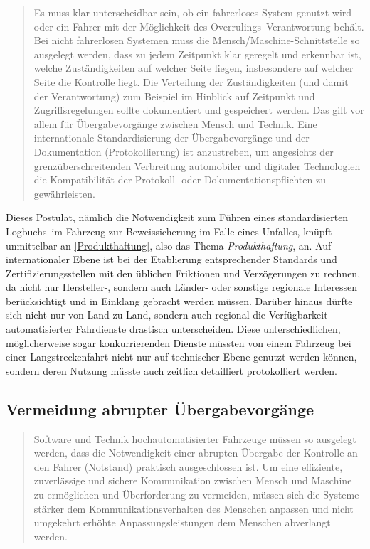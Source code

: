 \documentclass[twoside,a4paper,12pt]{article}
\begin{document}
\begin{quote}
\glqq
Es muss klar unterscheidbar sein, ob ein fahrerloses System genutzt wird oder ein Fahrer
mit der Möglichkeit des \glqq Overrulings\grqq\ Verantwortung behält. Bei nicht fahrerlosen Systemen muss die Mensch/Maschine-Schnittstelle 
so ausgelegt werden, dass zu jedem Zeitpunkt klar geregelt und erkennbar ist, welche Zuständigkeiten auf welcher Seite liegen,
insbesondere auf welcher Seite die Kontrolle liegt. Die Verteilung der Zuständigkeiten
(und damit der Verantwortung) zum Beispiel im Hinblick auf Zeitpunkt und Zugriffsregelungen sollte dokumentiert und gespeichert werden. 
Das gilt vor allem für Übergabevorgänge zwischen Mensch und Technik. Eine internationale Standardisierung der Übergabevorgänge 
und der Dokumentation (Protokollierung) ist anzustreben, um angesichts der
grenzüberschreitenden Verbreitung automobiler und digitaler Technologien die Kompatibilität der Protokoll- oder 
Dokumentationspflichten zu gewährleisten.\grqq\mbox{~\cite[S. 13]{ek}}
\end{quote}

Dieses Postulat, nämlich die Notwendigkeit zum Führen eines standardisierten \glqq Logbuchs\grqq\ im Fahrzeug zur Beweissicherung im Falle eines Unfalles, 
knüpft unmittelbar an \ref{Produkthaftung}, also das Thema \textit{Produkthaftung}, an. Auf internationaler Ebene ist bei der Etablierung entsprechender 
Standards und Zertifizierungsstellen mit den üblichen Friktionen und Verzögerungen zu rechnen, da nicht nur Hersteller-, sondern auch Länder- oder 
sonstige regionale Interessen berücksichtigt und in Einklang gebracht werden müssen. Darüber hinaus dürfte sich nicht nur von Land zu Land, sondern auch
regional die Verfügbarkeit automatisierter Fahrdienste drastisch unterscheiden. Diese unterschiedlichen, möglicherweise sogar konkurrierenden Dienste müssten von einem Fahrzeug bei einer Langstreckenfahrt nicht nur auf technischer Ebene genutzt werden können, sondern deren Nutzung müsste auch zeitlich detailliert protokolliert werden.\\

\subsection{Vermeidung abrupter Übergabevorgänge} \label{VermeidungAbrupterUebergabevorgaenge}

\begin{quote}
\glqq
Software und Technik hochautomatisierter Fahrzeuge müssen so ausgelegt werden, dass
die Notwendigkeit einer abrupten Übergabe der Kontrolle an den Fahrer (\glqq Notstand\grqq)
praktisch ausgeschlossen ist. Um eine effiziente, zuverlässige und sichere Kommunikation zwischen Mensch und Maschine zu 
ermöglichen und Überforderung zu vermeiden,
müssen sich die Systeme stärker dem Kommunikationsverhalten des Menschen anpassen
und nicht umgekehrt erhöhte Anpassungsleistungen dem Menschen abverlangt werden.\grqq\mbox{~\cite[S. 13]{ek}}
\end{quote}
\end{document}
